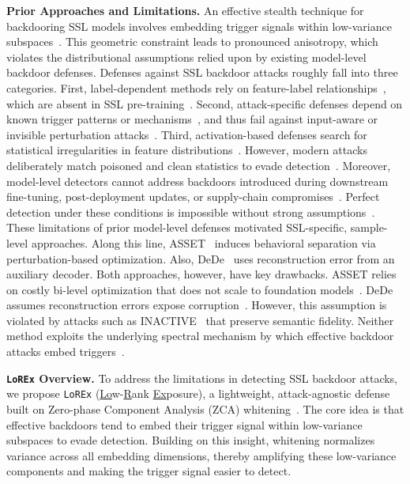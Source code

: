 \documentclass[letterpaper,twocolumn,10pt]{article}
\begin{document}
\par \textbf{Prior Approaches and Limitations.}
An effective stealth technique for backdooring SSL models involves embedding trigger signals within low-variance subspaces~\cite{zhang2025invisible}. This geometric constraint leads to pronounced anisotropy, which violates the distributional assumptions relied upon by existing model-level backdoor defenses.
Defenses against SSL backdoor attacks roughly fall into three categories. First, label-dependent methods rely on feature-label relationships~\cite{wang2019neural,liu2019abs}, which are absent in SSL pre-training~\cite{298036}. Second, attack-specific defenses depend on known trigger patterns or mechanisms~\cite{feng2023detecting,popovic2024debackdoor}, and thus fail against input-aware or invisible perturbation attacks~\cite{nguyen2021inputaware}. Third, activation-based defenses search for statistical irregularities in feature distributions~\cite{chen2018detecting,tran2018spectral}. However, modern attacks deliberately match poisoned and clean statistics to evade detection~\cite{tao2024distribution,zhang2025invisible}. Moreover, model-level detectors cannot address backdoors introduced during downstream fine-tuning, post-deployment updates, or supply-chain compromises~\cite{bagdasaryan2020backdoor,saha2020hidden}. Perfect detection under these conditions is impossible without strong assumptions~\cite{pichler2023limits}.
These limitations of prior model-level defenses motivated SSL-specific, sample-level approaches. Along this line, ASSET~\cite{asset} induces behavioral separation via perturbation-based optimization. Also, DeDe~\cite{hou2025dede} uses reconstruction error from an auxiliary decoder. Both approaches, however, have key drawbacks. ASSET relies on costly bi-level optimization that does not scale to foundation models~\cite{abad2025soklinedefensebackdoor}. DeDe assumes reconstruction errors expose corruption~\cite{hou2025dede}. However, this assumption is violated by attacks such as INACTIVE~\cite{zhang2025invisible} that preserve semantic fidelity. Neither method exploits the underlying spectral mechanism by which effective backdoor attacks embed triggers~\cite{tran2018spectral}.

\par \textbf{\texttt{LoREx} Overview.}
To address the limitations in detecting SSL backdoor attacks, we propose \texttt{LoREx} (\underline{Lo}w-\underline{R}ank \underline{Ex}posure), a lightweight, attack-agnostic defense built on Zero-phase Component Analysis (ZCA) whitening~\cite{kessy2018optimal}. The core idea is that effective backdoors tend to embed their trigger signal within low-variance subspaces to evade detection. Building on this insight, whitening normalizes variance across all embedding dimensions, thereby amplifying these low-variance components and making the trigger signal easier to detect.
\end{document}
